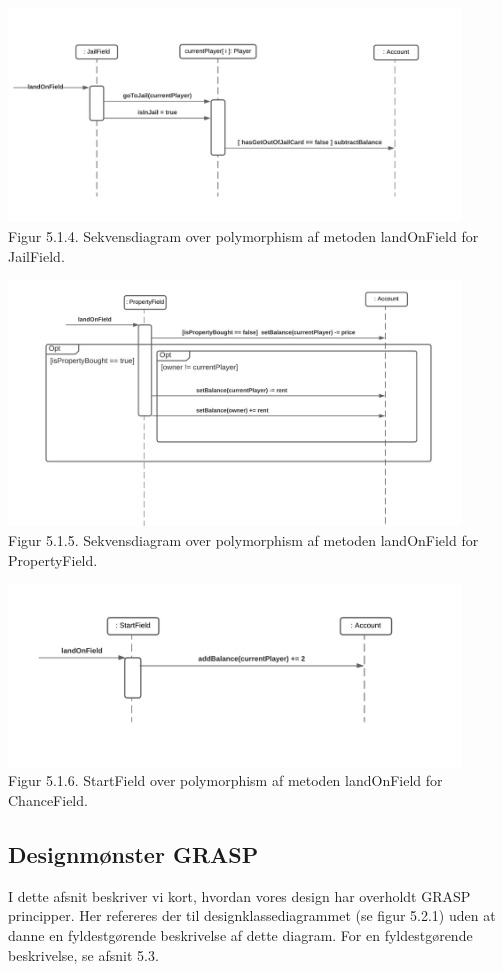 \begin{flushleft}
\includegraphics[width=0.9\textwidth]{Report/figures/Sekvensdiagram_JailField.png}~\\[0cm]
Figur 5.1.4. Sekvensdiagram over polymorphism af metoden landOnField for JailField.


\includegraphics[width=0.9\textwidth]{Report/figures/Sekvensdiagram_PropertyField.png}~\\[0cm]
Figur 5.1.5. Sekvensdiagram over polymorphism af metoden landOnField for PropertyField.


\includegraphics[width=0.9\textwidth]{Report/figures/Sekvensdiagram_StartField.png}~\\[0cm]
Figur 5.1.6. StartField over polymorphism af metoden landOnField for ChanceField.
\subsection{Designmønster GRASP}
I dette afsnit beskriver vi kort, hvordan vores design har overholdt GRASP principper. Her refereres der til designklassediagrammet (se figur 5.2.1) uden at danne en fyldestgørende beskrivelse af dette diagram. For en fyldestgørende beskrivelse, se afsnit 5.3.

\end{flushleft}
